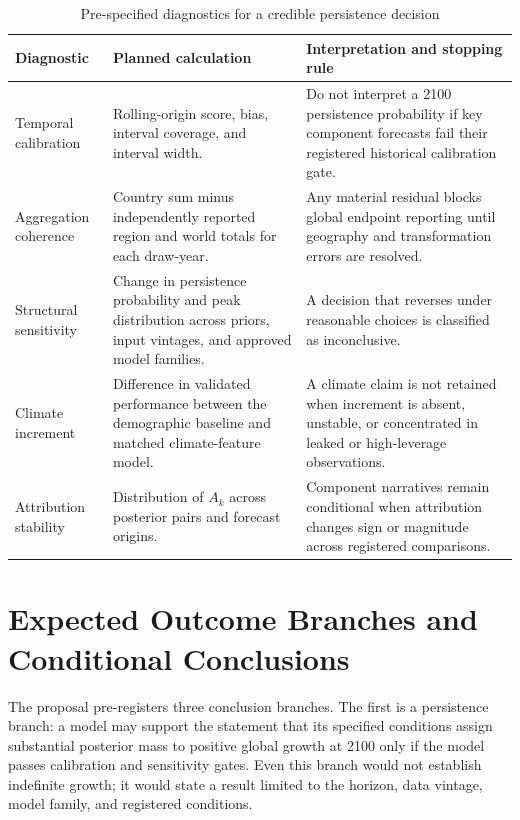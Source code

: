 \documentclass[conference]{IEEEtran}
\begin{document}
\begin{table}[t]
\caption{Pre-specified diagnostics for a credible persistence decision}
\label{tab:diagnostics}
\centering
\footnotesize
\begin{tabular}{L{0.19\textwidth}L{0.27\textwidth}L{0.45\textwidth}}
\toprule
Diagnostic & Planned calculation & Interpretation and stopping rule \\
\midrule
Temporal calibration & Rolling-origin score, bias, interval coverage, and interval width. & Do not interpret a 2100 persistence probability if key component forecasts fail their registered historical calibration gate. \\
Aggregation coherence & Country sum minus independently reported region and world totals for each draw-year. & Any material residual blocks global endpoint reporting until geography and transformation errors are resolved. \\
Structural sensitivity & Change in persistence probability and peak distribution across priors, input vintages, and approved model families. & A decision that reverses under reasonable choices is classified as inconclusive. \\
Climate increment & Difference in validated performance between the demographic baseline and matched climate-feature model. & A climate claim is not retained when increment is absent, unstable, or concentrated in leaked or high-leverage observations. \\
Attribution stability & Distribution of $A_k$ across posterior pairs and forecast origins. & Component narratives remain conditional when attribution changes sign or magnitude across registered comparisons. \\
\bottomrule
\end{tabular}
\end{table}

\section{Expected Outcome Branches and Conditional Conclusions}

The proposal pre-registers three conclusion branches. The first is a persistence branch: a model may support the statement that its specified conditions assign substantial posterior mass to positive global growth at 2100 only if the model passes calibration and sensitivity gates. Even this branch would not establish indefinite growth; it would state a result limited to the horizon, data vintage, model family, and registered conditions.
\end{document}
